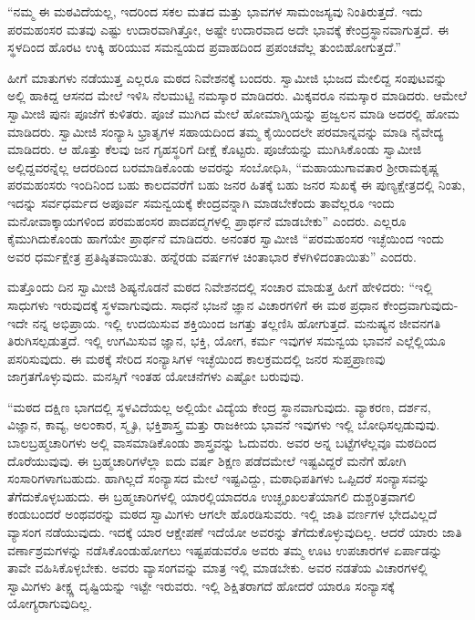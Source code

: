  “ನಮ್ಮ ಈ ಮಠವಿದೆಯಲ್ಲ, ಇದರಿಂದ ಸಕಲ ಮತದ ಮತ್ತು ಭಾವಗಳ ಸಾಮಂಜಸ್ಯವು ನಿಂತಿರುತ್ತದೆ. ಇದು ಪರಮಹಂಸರ ಮತವು ಎಷ್ಟು ಉದಾರವಾಗಿತ್ತೋ, ಅಷ್ಟೇ ಉದಾರವಾದ ಅದೇ ಭಾವಕ್ಕೆ ಕೇಂದ್ರಸ್ಥಾನವಾಗುತ್ತದೆ. ಈ ಸ್ಥಳದಿಂದ ಹೊರಟ ಉಕ್ಕಿ ಹರಿಯುವ ಸಮನ್ವಯದ ಪ್ರವಾಹದಿಂದ ಪ್ರಪಂಚವೆಲ್ಲ ತುಂಬಿಹೋಗುತ್ತದೆ.” 

 ಹೀಗೆ ಮಾತುಗಳು ನಡೆಯುತ್ತ ಎಲ್ಲರೂ ಮಠದ ನಿವೇಶನಕ್ಕೆ ಬಂದರು. ಸ್ವಾಮೀಜಿ ಭುಜದ ಮೇಲಿದ್ದ ಸಂಪುಟವನ್ನು ಅಲ್ಲಿ ಹಾಕಿದ್ದ ಆಸನದ ಮೇಲೆ ಇಳಿಸಿ ನೆಲಮುಟ್ಟಿ ನಮಸ್ಕಾರ ಮಾಡಿದರು. ಮಿಕ್ಕವರೂ ನಮಸ್ಕಾರ ಮಾಡಿದರು. ಆಮೇಲೆ ಸ್ವಾಮೀಜಿ ಪುನಃ ಪೂಜೆಗೆ ಕುಳಿತರು. ಪೂಜೆ ಮುಗಿದ ಮೇಲೆ ಹೋಮಾಗ್ನಿಯನ್ನು ಪ್ರಜ್ವಲನ ಮಾಡಿ ಅದರಲ್ಲಿ ಹೋಮ ಮಾಡಿದರು. ಸ್ವಾಮೀಜಿ ಸಂನ್ಯಾಸಿ ಭ್ರಾತೃಗಳ ಸಹಾಯದಿಂದ ತಮ್ಮ ಕೈಯಿಂದಲೇ ಪರಮಾನ್ನವನ್ನು ಮಾಡಿ ನೈವೇದ್ಯ ಮಾಡಿದರು. ಆ ಹೊತ್ತು ಕೆಲವು ಜನ ಗೃಹಸ್ಥರಿಗೆ ದೀಕ್ಷೆ ಕೊಟ್ಟರು. ಪೂಜೆಯನ್ನು ಮುಗಿಸಿಕೊಂಡು ಸ್ವಾಮೀಜಿ ಅಲ್ಲಿದ್ದವರನ್ನೆಲ್ಲ ಆದರದಿಂದ ಬರಮಾಡಿಕೊಂಡು ಅವರನ್ನು ಸಂಬೋಧಿಸಿ, “ಮಹಾಯುಗಾವತಾರ ಶ‍್ರೀರಾಮಕೃಷ್ಣ ಪರಮಹಂಸರು ಇಂದಿನಿಂದ ಬಹು ಕಾಲದವರೆಗೆ ಬಹು ಜನರ ಹಿತಕ್ಕೆ ಬಹು ಜನರ ಸುಖಕ್ಕೆ ಈ ಪುಣ್ಯಕ್ಷೇತ್ರದಲ್ಲಿ ನಿಂತು, ಇದನ್ನು ಸರ್ವಧರ್ಮದ ಅಪೂರ್ವ ಸಮನ್ವಯಕ್ಕೆ ಕೇಂದ್ರವನ್ನಾಗಿ ಮಾಡಬೇಕೆಂದು ತಾವೆಲ್ಲರೂ ಇಂದು ಮನೋವಾಕ್ಕಾಯಗಳಿಂದ ಪರಮಹಂಸರ ಪಾದಪದ್ಮಗಳಲ್ಲಿ ಪ್ರಾರ್ಥನೆ ಮಾಡಬೇಕು” ಎಂದರು. ಎಲ್ಲರೂ ಕೈಮುಗಿದುಕೊಂಡು ಹಾಗೆಯೇ ಪ್ರಾರ್ಥನೆ ಮಾಡಿದರು. ಅನಂತರ ಸ್ವಾಮೀಜಿ “ಪರಮಹಂಸರ ಇಚ್ಛೆಯಿಂದ ಇಂದು ಅವರ ಧರ್ಮಕ್ಷೇತ್ರ ಪ್ರತಿಷ್ಠಿತವಾಯಿತು. ಹನ್ನೆರಡು ವರ್ಷಗಳ ಚಿಂತಾಭಾರ ಕೆಳಗಿಳಿದಂತಾಯಿತು” ಎಂದರು. 

 ಮತ್ತೊಂದು ದಿನ ಸ್ವಾಮೀಜಿ ಶಿಷ್ಯನೊಡನೆ ಮಠದ ನಿವೇಶನದಲ್ಲಿ ಸಂಚಾರ ಮಾಡುತ್ತ ಹೀಗೆ ಹೇಳಿದರು: “ಇಲ್ಲಿ ಸಾಧುಗಳು ಇರುವುದಕ್ಕೆ ಸ್ಥಳವಾಗುವುದು. ಸಾಧನೆ ಭಜನೆ ಜ್ಞಾನ ವಿಚಾರಗಳಿಗೆ ಈ ಮಠ ಪ್ರಧಾನ ಕೇಂದ್ರವಾಗುವುದು- ಇದೇ ನನ್ನ ಅಭಿಪ್ರಾಯ. ಇಲ್ಲಿ ಉದಯಿಸುವ ಶಕ್ತಿಯಿಂದ ಜಗತ್ತು ತಲ್ಲಣಿಸಿ ಹೋಗುತ್ತದೆ. ಮನುಷ್ಯನ ಜೀವನಗತಿ ತಿರುಗಿಸಲ್ಪಡುತ್ತದೆ. ಇಲ್ಲಿ ಉಗಮಿಸುವ ಜ್ಞಾನ, ಭಕ್ತಿ, ಯೋಗ, ಕರ್ಮ ಇವುಗಳ ಸಮನ್ವಯ ಭಾವನೆ ಎಲ್ಲೆಲ್ಲಿಯೂ ಪಸರಿಸುವುದು. ಈ ಮಠಕ್ಕೆ ಸೇರಿದ ಸಂನ್ಯಾಸಿಗಳ ಇಚ್ಛೆಯಿಂದ ಕಾಲಕ್ರಮದಲ್ಲಿ ಜನರ ಸುಪ್ತಪ್ರಾಣವು ಜಾಗ್ರತಗೊಳ್ಳುವುದು. ಮನಸ್ಸಿಗೆ ಇಂತಹ ಯೋಚನೆಗಳು ಎಷ್ಟೋ ಬರುವುವು. 

 “ಮಠದ ದಕ್ಷಿಣ ಭಾಗದಲ್ಲಿ ಸ್ಥಳವಿದೆಯಲ್ಲ ಅಲ್ಲಿಯೇ ವಿದ್ಯೆಯ ಕೇಂದ್ರ ಸ್ಥಾನವಾಗುವುದು. ವ್ಯಾಕರಣ, ದರ್ಶನ, ವಿಜ್ಞಾನ, ಕಾವ್ಯ, ಅಲಂಕಾರ, ಸ್ಮೃತಿ, ಭಕ್ತಿಶಾಸ್ತ್ರ ಮತ್ತು ರಾಜಕೀಯ ಭಾವನೆ ಇವುಗಳು ಇಲ್ಲಿ ಬೋಧಿಸಲ್ಪಡುವುವು. ಬಾಲಬ್ರಹ್ಮಚಾರಿಗಳು ಅಲ್ಲಿ ವಾಸಮಾಡಿಕೊಂಡು ಶಾಸ್ತ್ರವನ್ನು ಓದುವರು. ಅವರ ಅನ್ನ ಬಟ್ಟೆಗಳೆಲ್ಲವೂ ಮಠದಿಂದ ದೊರೆಯುವುವು. ಈ ಬ್ರಹ್ಮಚಾರಿಗಳೆಲ್ಲಾ ಐದು ವರ್ಷ ಶಿಕ್ಷಣ ಪಡೆದಮೇಲೆ ಇಷ್ಟವಿದ್ದರೆ ಮನೆಗೆ ಹೋಗಿ ಸಂಸಾರಿಗಳಾಗಬಹುದು. ಹಾಗಿಲ್ಲದೆ ಸಂನ್ಯಾಸದ ಮೇಲೆ ಇಷ್ಟವಿದ್ದು, ಮಠಾಧಿಪತಿಗಳು ಒಪ್ಪಿದರೆ ಸಂನ್ಯಾಸವನ್ನು ತೆಗೆದುಕೊಳ್ಳಬಹುದು. ಈ ಬ್ರಹ್ಮಚಾರಿಗಳಲ್ಲಿ ಯಾರಲ್ಲಿಯಾದರೂ ಉಚ್ಛೃಂಖಲತೆಯಾಗಲಿ ದುಶ್ಚರಿತ್ರವಾಗಲಿ ಕಂಡುಬಂದರೆ ಅಂಥವರನ್ನು ಮಠದ ಸ್ವಾಮಿಗಳು ಆಗಲೇ‌ ಹೊರಡಿಸುವರು. ಇಲ್ಲಿ ಜಾತಿ ವರ್ಣಗಳ ಭೇದವಿಲ್ಲದೆ ವ್ಯಾಸಂಗ ನಡೆಯುವುದು. ಇದಕ್ಕೆ ಯಾರ ಆಕ್ಷೇಪಣೆ ಇದೆಯೋ ಅವರನ್ನು ತೆಗೆದುಕೊಳ್ಳುವುದಿಲ್ಲ. ಆದರೆ ಯಾರು ಜಾತಿ ವರ್ಣಾಶ್ರಮಗಳನ್ನು ನಡೆಸಿಕೊಂಡುಹೋಗಲು ಇಷ್ಟಪಡುವರೊ ಅವರು ತಮ್ಮ ಊಟ ಉಪಚಾರಗಳ ಏರ್ಪಾಡನ್ನು ತಾವೇ ವಹಿಸಿಕೊಳ್ಳಬೇಕು. ಅವರು ವ್ಯಾಸಂಗವನ್ನು ಮಾತ್ರ ಇಲ್ಲಿ ಮಾಡಬೇಕು. ಅವರ ನಡತೆಯ ವಿಚಾರಗಳಲ್ಲಿ ಸ್ವಾಮಿಗಳು ತೀಕ್ಷ್ಣ ದೃಷ್ಟಿಯನ್ನು ಇಟ್ಟೇ ಇರುವರು. ಇಲ್ಲಿ ಶಿಕ್ಷಿತರಾಗದೆ ಹೋದರೆ ಯಾರೂ ಸಂನ್ಯಾಸಕ್ಕೆ ಯೋಗ್ಯರಾಗುವುದಿಲ್ಲ. 

